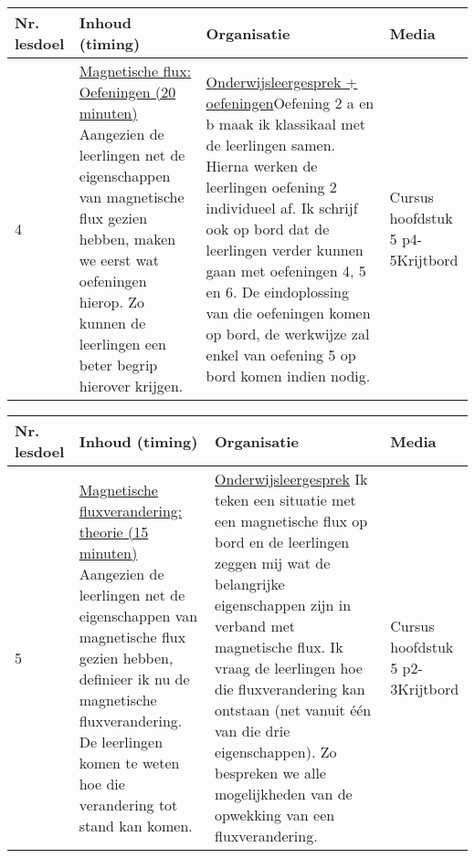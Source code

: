 \begin{landscape}
\begin{tabularx}{1.56\textwidth}{|p{1.5cm}|p{8cm}|X|p{3cm}|}
	\hline
	\textbf{Nr. lesdoel } & \textbf{Inhoud (timing)}  & \textbf{Organisatie } & \textbf{Media } \\ \hline
	4& \underline{Magnetische flux: Oefeningen (20 minuten)}\newline
	Aangezien de leerlingen net de eigenschappen van magnetische flux gezien hebben, maken we eerst wat oefeningen hierop. Zo kunnen de leerlingen een beter begrip hierover krijgen.
	&  \underline{Onderwijsleergesprek + oefeningen}\newline  Oefening 2 a en b maak ik klassikaal met de leerlingen samen. Hierna werken de leerlingen oefening 2 individueel af. Ik schrijf ook op bord dat de leerlingen verder kunnen gaan met oefeningen 4, 5 en 6. De eindoplossing van die oefeningen komen op bord, de werkwijze zal enkel van oefening 5 op bord komen indien nodig.
	&  Cursus hoofdstuk 5 p4-5\newline\newline Krijtbord
	\\ \hline
\end{tabularx}\vspace{5mm}


\begin{tabularx}{1.56\textwidth}{|p{1.5cm}|p{8cm}|X|p{3cm}|}
\hline
\textbf{Nr. lesdoel } & \textbf{Inhoud (timing)}  & \textbf{Organisatie } & \textbf{Media } \\ \hline
5& \underline{Magnetische fluxverandering:} \underline{theorie (15 minuten)}\newline
Aangezien de leerlingen net de eigenschappen van magnetische flux gezien hebben, definieer ik nu de magnetische fluxverandering. De leerlingen komen te weten hoe die verandering tot stand kan komen.
&  \underline{Onderwijsleergesprek}\newline 
Ik teken een situatie met een magnetische flux op bord en de leerlingen zeggen mij wat de belangrijke eigenschappen zijn in verband met magnetische flux. Ik vraag de leerlingen hoe die fluxverandering kan ontstaan (net vanuit één van die drie eigenschappen). Zo bespreken we alle mogelijkheden van de opwekking van een fluxverandering.	
&  Cursus hoofdstuk 5 p2-3\newline\newline Krijtbord
\\ \hline
\end{tabularx}\vspace{5mm}




\end{landscape}
